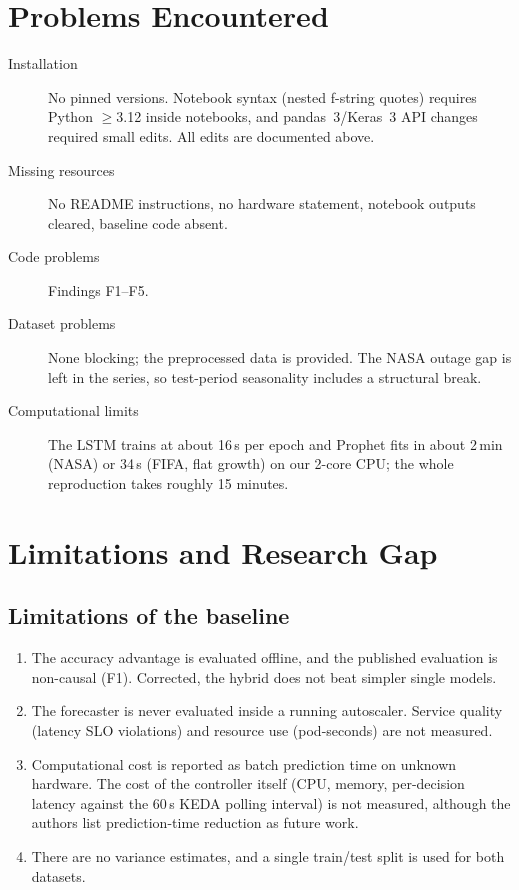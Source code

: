 \documentclass[11pt,a4paper]{article}
\begin{document}
\section{Problems Encountered}
\begin{description}
\item[Installation] No pinned versions. Notebook syntax (nested f-string quotes) requires Python $\geq$3.12 inside notebooks, and pandas~3/Keras~3 API changes required small edits. All edits are documented above.
\item[Missing resources] No README instructions, no hardware statement, notebook outputs cleared, baseline code absent.
\item[Code problems] Findings F1--F5.
\item[Dataset problems] None blocking; the preprocessed data is provided. The NASA outage gap is left in the series, so test-period seasonality includes a structural break.
\item[Computational limits] The LSTM trains at about 16\,s per epoch and Prophet fits in about 2\,min (NASA) or 34\,s (FIFA, flat growth) on our 2-core CPU; the whole reproduction takes roughly 15 minutes.
\end{description}

\section{Limitations and Research Gap}\label{sec:gap}
\subsection{Limitations of the baseline}
\begin{enumerate}
\item The accuracy advantage is evaluated offline, and the published evaluation is non-causal (F1). Corrected, the hybrid does not beat simpler single models.
\item The forecaster is never evaluated inside a running autoscaler. Service quality (latency SLO violations) and resource use (pod-seconds) are not measured.
\item Computational cost is reported as batch prediction time on unknown hardware. The cost of the controller itself (CPU, memory, per-decision latency against the 60\,s KEDA polling interval) is not measured, although the authors list prediction-time reduction as future work.
\item There are no variance estimates, and a single train/test split is used for both datasets.
\end{enumerate}
\end{document}
